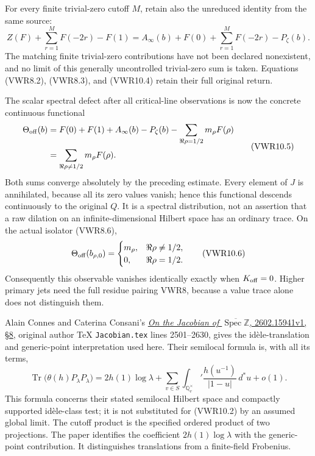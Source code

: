 For every finite trivial-zero cutoff \(M\), retain also the unreduced
identity from the same source: \[
Z(F)+\sum_{r=1}^{M}F(-2r)-F(1)
=A_\infty(b)+F(0)+\sum_{r=1}^{M}F(-2r)-P_\zeta(b).
\tag{VWR10.4}
\] The matching finite trivial-zero contributions have not been declared
nonexistent, and no limit of this generally uncontrolled trivial-zero
sum is taken. Equations (VWR8.2), (VWR8.3), and (VWR10.4) retain their
full original return.

The scalar spectral defect after all critical-line observations is now
the concrete continuous functional \[
\begin{aligned}
\Theta_{\rm off}(b)
&=F(0)+F(1)+A_\infty(b)-P_\zeta(b)
 -\sum_{\Re\rho=1/2}m_\rho F(\rho)\\
&=\sum_{\Re\rho\ne1/2}m_\rho F(\rho).
\end{aligned}
\tag{VWR10.5}
\] Both sums converge absolutely by the preceding estimate. Every
element of \(J\) is annihilated, because all its zero values vanish;
hence this functional descends continuously to the original \(Q\). It is
a spectral distribution, not an assertion that a raw dilation on an
infinite-dimensional Hilbert space has an ordinary trace. On the actual
isolator (VWR8.6), \[
\Theta_{\rm off}(b_{\rho,0})=
\begin{cases}m_\rho,&\Re\rho\ne1/2,\\0,&\Re\rho=1/2.\end{cases}
\tag{VWR10.6}
\] Consequently this observable vanishes identically exactly when
\(K_{\rm off}=0\). Higher primary jets need the full residue pairing
VWR8, because a value trace alone does not distinguish them.

Alain Connes and Caterina Consani's
\href{https://arxiv.org/abs/2602.15941v1}{\emph{On the Jacobian of
\(\overline{\operatorname{Spec}\mathbb Z}\)}, 2602.15941v1, §8},
original author TeX \texttt{Jacobian.tex} lines 2501--2630, gives the
idèle-translation and generic-point interpretation used here. Their
semilocal formula is, with all its terms, \[
\operatorname{Tr}\bigl(\theta(h)\widehat P_\lambda P_\lambda\bigr)
=2h(1)\log\lambda+
\sum_{v\in S}\int_{\mathbb Q_v^\times}'
 \frac{h(u^{-1})}{|1-u|}\,d^*u+o(1).
\tag{VWR10.7}
\] This formula concerns their stated semilocal Hilbert space and
compactly supported idèle-class test; it is not substituted for
(VWR10.2) by an assumed global limit. The cutoff product is the
specified ordered product of two projections. The paper identifies the
coefficient \(2h(1)\log\lambda\) with the generic-point contribution. It
distinguishes translations from a finite-field Frobenius.

